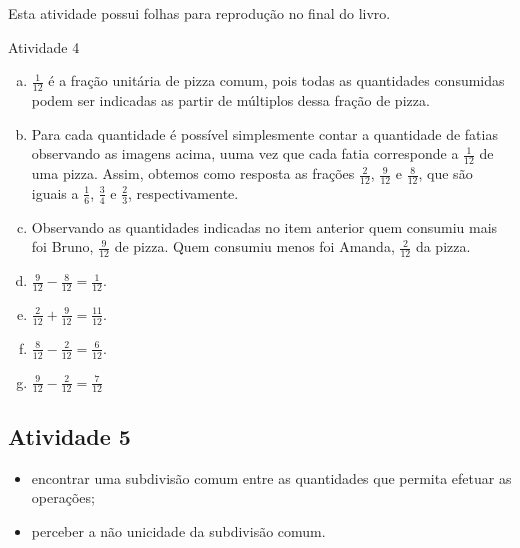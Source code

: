 \begin{multicols}{2}
\begin{itemize}
Esta atividade possui folhas para reprodução no final do livro.
\end{itemize} %

\begin{resposta*}{Atividade 4}
  \begin{enumerate}[a)]
   \item $\frac{1}{12}$ é a fração unitária de pizza comum, pois todas as quantidades consumidas podem ser indicadas as partir de múltiplos dessa fração de pizza. 
   \item Para cada quantidade é possível simplesmente contar a quantidade de fatias observando as imagens acima, uuma vez que cada fatia corresponde a $\frac{1}{12}$ de uma pizza. Assim, obtemos como resposta as frações $\frac{2}{12}$, $\frac{9}{12}$ e $\frac{8}{12}$, que são iguais a $\frac{1}{6}$, $\frac{3}{4}$ e $\frac{2}{3}$, respectivamente. 
   \item  Observando as quantidades indicadas no item anterior quem consumiu mais foi Bruno, $\frac{9}{12}$ de pizza. Quem consumiu menos foi Amanda, $\frac{2}{12}$ da pizza. 
   \item  $\frac{9}{12} -  \frac{8}{12} = \frac{1}{12}$.
   \item  $\frac{2}{12} +  \frac{9}{12} = \frac{11}{12}$.
   \item  $\frac{8}{12} -  \frac{2}{12} = \frac{6}{12}$.
   \item  $\frac{9}{12} -  \frac{2}{12} = \frac{7}{12}$
  \end{enumerate}
 
\end{resposta*}



\subsection{Atividade 5}

  \newline \vspace{.15cm}  

  \begin{itemize} %
    \item       encontrar uma subdivisão comum entre as quantidades que permita efetuar as operações;
    \item       perceber a não unicidade da subdivisão comum.
\end{itemize} %
  
   \vspace{.15cm}  


\end{multicols}
